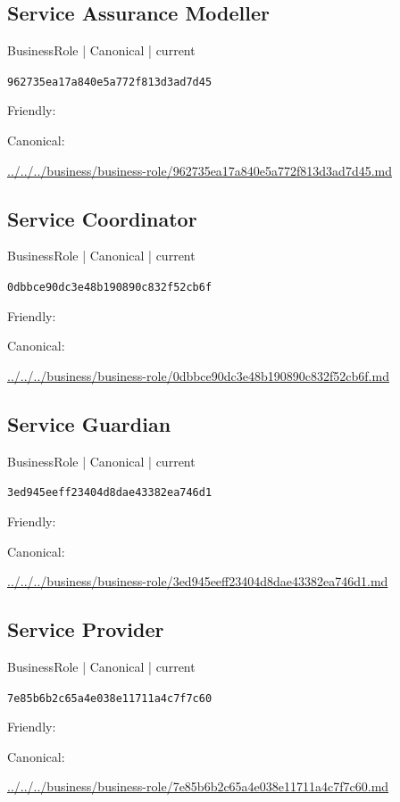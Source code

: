 \documentclass[10pt,a4paper]{article}
\begin{document}
\subsection*{Service Assurance Modeller}
{\small BusinessRole | Canonical | current}\par
\texttt{962735ea17a840e5a772f813d3ad7d45}\par
Friendly: \par
Canonical: \par
{\footnotesize\url{../../../business/business-role/962735ea17a840e5a772f813d3ad7d45.md}}\par
\subsection*{Service Coordinator}
{\small BusinessRole | Canonical | current}\par
\texttt{0dbbce90dc3e48b190890c832f52cb6f}\par
Friendly: \par
Canonical: \par
{\footnotesize\url{../../../business/business-role/0dbbce90dc3e48b190890c832f52cb6f.md}}\par
\subsection*{Service Guardian}
{\small BusinessRole | Canonical | current}\par
\texttt{3ed945eeff23404d8dae43382ea746d1}\par
Friendly: \par
Canonical: \par
{\footnotesize\url{../../../business/business-role/3ed945eeff23404d8dae43382ea746d1.md}}\par
\subsection*{Service Provider}
{\small BusinessRole | Canonical | current}\par
\texttt{7e85b6b2c65a4e038e11711a4c7f7c60}\par
Friendly: \par
Canonical: \par
{\footnotesize\url{../../../business/business-role/7e85b6b2c65a4e038e11711a4c7f7c60.md}}\par
\end{document}
